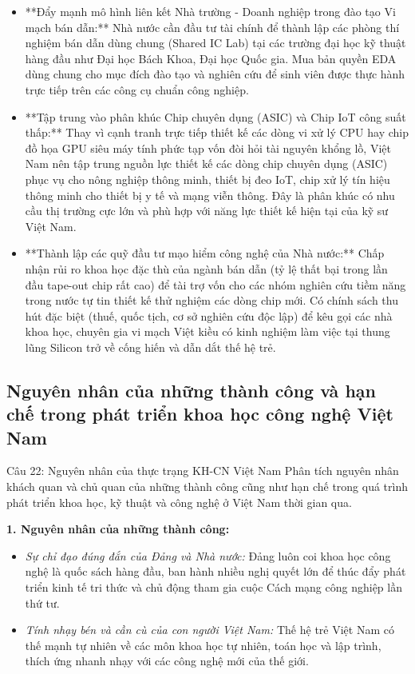 \documentclass[12pt,a4paper]{article}
\begin{document}
{\begin{itemize}
    \item **Đẩy mạnh mô hình liên kết Nhà trường - Doanh nghiệp trong đào tạo Vi mạch bán dẫn:** Nhà nước cần đầu tư tài chính để thành lập các phòng thí nghiệm bán dẫn dùng chung (Shared IC Lab) tại các trường đại học kỹ thuật hàng đầu như Đại học Bách Khoa, Đại học Quốc gia. Mua bản quyền EDA dùng chung cho mục đích đào tạo và nghiên cứu để sinh viên được thực hành trực tiếp trên các công cụ chuẩn công nghiệp.
    \item **Tập trung vào phân khúc Chip chuyên dụng (ASIC) và Chip IoT công suất thấp:** Thay vì cạnh tranh trực tiếp thiết kế các dòng vi xử lý CPU hay chip đồ họa GPU siêu máy tính phức tạp vốn đòi hỏi tài nguyên khổng lồ, Việt Nam nên tập trung nguồn lực thiết kế các dòng chip chuyên dụng (ASIC) phục vụ cho nông nghiệp thông minh, thiết bị đeo IoT, chip xử lý tín hiệu thông minh cho thiết bị y tế và mạng viễn thông. Đây là phân khúc có nhu cầu thị trường cực lớn và phù hợp với năng lực thiết kế hiện tại của kỹ sư Việt Nam.
    \item **Thành lập các quỹ đầu tư mạo hiểm công nghệ của Nhà nước:** Chấp nhận rủi ro khoa học đặc thù của ngành bán dẫn (tỷ lệ thất bại trong lần đầu tape-out chip rất cao) để tài trợ vốn cho các nhóm nghiên cứu tiềm năng trong nước tự tin thiết kế thử nghiệm các dòng chip mới. Có chính sách thu hút đặc biệt (thuế, quốc tịch, cơ sở nghiên cứu độc lập) để kêu gọi các nhà khoa học, chuyên gia vi mạch Việt kiều có kinh nghiệm làm việc tại thung lũng Silicon trở về cống hiến và dẫn dắt thế hệ trẻ.
\end{itemize}

\subsection{Nguyên nhân của những thành công và hạn chế trong phát triển khoa học công nghệ Việt Nam}

\begin{questionbox}{Câu 22: Nguyên nhân của thực trạng KH-CN Việt Nam}
Phân tích nguyên nhân khách quan và chủ quan của những thành công cũng như hạn chế trong quá trình phát triển khoa học, kỹ thuật và công nghệ ở Việt Nam thời gian qua.
\end{questionbox}

\noindent
\textbf{1. Nguyên nhân của những thành công:}
\begin{itemize}
    \item \textit{Sự chỉ đạo đúng đắn của Đảng và Nhà nước:} Đảng luôn coi khoa học công nghệ là quốc sách hàng đầu, ban hành nhiều nghị quyết lớn để thúc đẩy phát triển kinh tế tri thức và chủ động tham gia cuộc Cách mạng công nghiệp lần thứ tư.
    \item \textit{Tính nhạy bén và cần cù của con người Việt Nam:} Thế hệ trẻ Việt Nam có thế mạnh tự nhiên về các môn khoa học tự nhiên, toán học và lập trình, thích ứng nhanh nhạy với các công nghệ mới của thế giới.
\end{itemize}

}
\end{document}
